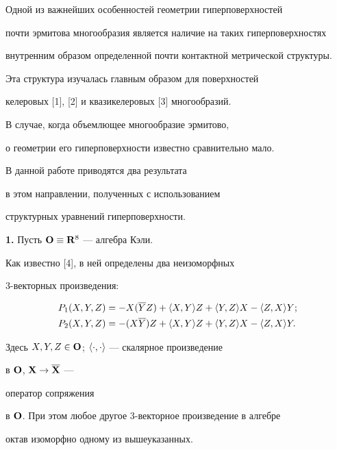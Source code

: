 \label{begin}











Одной из важнейших особенностей геометрии гиперповерхностей 


почти эрмитова многообразия является наличие на таких гиперповерхностях 


внутренним образом определенной почти контактной метрической структуры. 


Эта структура изучалась главным образом для поверхностей 


келеровых [1], [2] и квазикелеровых [3] многообразий. 


В случае, когда объемлющее многообразие эрмитово, 


о геометрии его гиперповерхности известно сравнительно мало.





В данной работе приводятся два результата 


в этом направлении, полученных  с использованием


структурных уравнений гиперповерхности.


\medskip





{\bf 1.} Пусть $\bold O \equiv \bold R^8$ --- алгебра Кэли. 


Как известно [4], в ней определены два неизоморфных


3-векторных произведения: 


\begin{align*}


P_1 (X,Y,Z)&=-X(\overline{Y}Z) + \la X,Y\ra Z+\la Y,Z\ra X - \la Z,X\ra Y;\\


P_2 (X,Y,Z)&=-(X \overline{Y})Z + \la X,Y\ra Z+\la Y,Z\ra X - \la Z,X\ra Y.


\end{align*}


Здесь $X,Y,Z \in \bold O $; $\langle \cdot,\cdot\rangle$ --- скалярное произведение 


в $\bold O$, $\bold X \rightarrow \overline{\bold X}$ ---


оператор сопряжения 


в $\bold O$. При этом любое другое 3-векторное произведение в алгебре


октав изоморфно одному из вышеуказанных.





